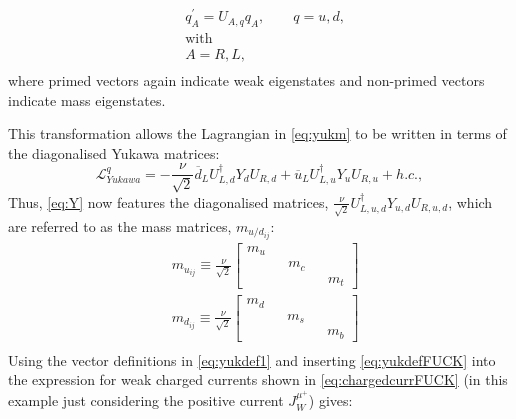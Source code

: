 \begin{equation}
  \begin{split}
    &
    q^{\prime}_{A} = U_{A,q}q_{A}, \qquad q = u,d,\\
&  \mathrm{with}\\
  &  A = R,L,\\
  \end{split}
  \label{eq:yukdefFUCK}
\end{equation}
where primed vectors again indicate weak eigenstates and non-primed vectors indicate mass eigenstates.

This transformation allows the Lagrangian in \autoref{eq:yukm} to be written in terms of the diagonalised Yukawa matrices:
\begin{equation}
  \mathcal{L}^{q}_{Yukawa} = -\frac{\nu}{\sqrt{2}}{\overline{d}_{L}U^{\dagger}_{L,d}Y_{d}U_{R,d} + \overline{u}_{L}U^{\dagger}_{L,u}Y_{u}U_{R,u} + h.c.},
  \label{eq:Y}
\end{equation}
Thus, \autoref{eq:Y} now features the diagonalised matrices, $\frac{\nu}{\sqrt{2}}U^{\dagger}_{L,u,d}Y_{u,d}U_{R,u,d}$, which are referred to as the mass matrices, $m_{u/d_{ij}}$:
\begin{equation}
  \begin{split}
    &
    m_{u_{ij}} \equiv \frac{\nu}{\sqrt{2}}\begin{bmatrix}m_{u}&& && \\ &&m_{c}&& \\ && &&m_{t}\end{bmatrix} \\
    &
    m_{d_{ij}} \equiv \frac{\nu}{\sqrt{2}}\begin{bmatrix}m_{d}&& && \\ &&m_{s}&& \\ && &&m_{b}\end{bmatrix}\\
  \end{split}
  \label{eq:W}
\end{equation}
Using the vector definitions in \autoref{eq:yukdef1} and inserting \autoref{eq:yukdefFUCK} into the expression for weak charged currents shown in \autoref{eq:chargedcurrFUCK} (in this example just considering the positive current $J^{\mu^{+}}_{W}$) gives:

